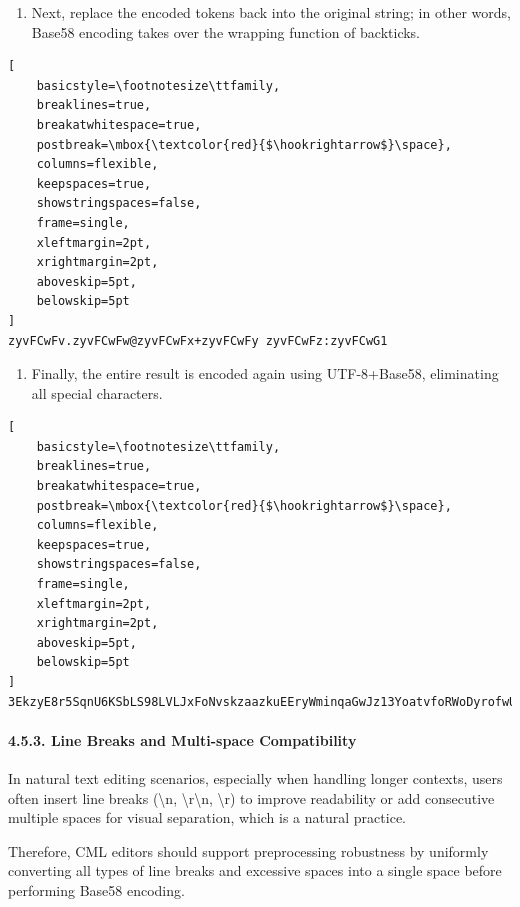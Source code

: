 \documentclass[conference]{IEEEtran}
\begin{document}
\begin{enumerate}
\def\labelenumi{\arabic{enumi}.}
\item
  Next, replace the encoded tokens back into the original string; in
  other words, Base58 encoding takes over the wrapping function of
  backticks.
\end{enumerate}

\begin{lstlisting}[
    basicstyle=\footnotesize\ttfamily,
    breaklines=true,
    breakatwhitespace=true,
    postbreak=\mbox{\textcolor{red}{$\hookrightarrow$}\space},
    columns=flexible,
    keepspaces=true,
    showstringspaces=false,
    frame=single,
    xleftmargin=2pt,
    xrightmargin=2pt,
    aboveskip=5pt,
    belowskip=5pt
]
zyvFCwFv.zyvFCwFw@zyvFCwFx+zyvFCwFy zyvFCwFz:zyvFCwG1
\end{lstlisting}

\begin{enumerate}
\def\labelenumi{\arabic{enumi}.}
\item
  Finally, the entire result is encoded again using UTF-8+Base58,
  eliminating all special characters.
\end{enumerate}

\begin{lstlisting}[
    basicstyle=\footnotesize\ttfamily,
    breaklines=true,
    breakatwhitespace=true,
    postbreak=\mbox{\textcolor{red}{$\hookrightarrow$}\space},
    columns=flexible,
    keepspaces=true,
    showstringspaces=false,
    frame=single,
    xleftmargin=2pt,
    xrightmargin=2pt,
    aboveskip=5pt,
    belowskip=5pt
]
3EkzyE8r5SqnU6KSbLS98LVLJxFoNvskzaazkuEEryWminqaGwJz13YoatvfoRWoDyrofwUCQ
\end{lstlisting}

\paragraph{4.5.3. Line Breaks and Multi-space
Compatibility}\label{453-line-breaks-and-multi-space-compatibility}

In natural text editing scenarios, especially when handling longer
contexts, users often insert line breaks (\textbackslash n,
\textbackslash r\textbackslash n, \textbackslash r) to improve
readability or add consecutive multiple spaces for visual separation,
which is a natural practice.

Therefore, CML editors should support preprocessing robustness by
uniformly converting all types of line breaks and excessive spaces into
a single space before performing Base58 encoding.
\end{document}
